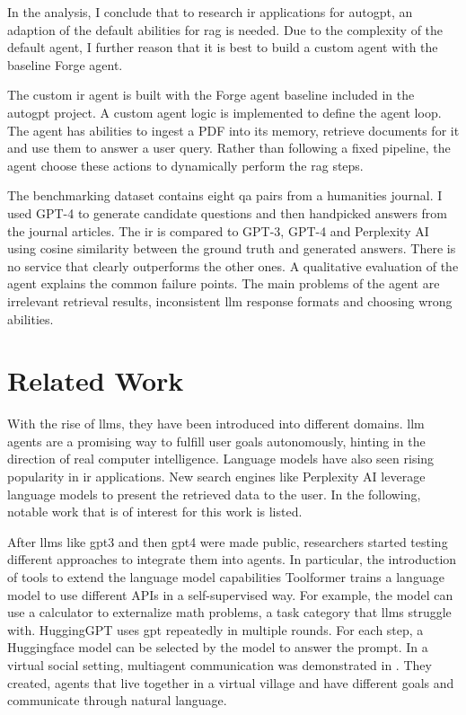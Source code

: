 \documentclass[../main.tex]{subfiles}
\begin{document}
In the analysis, I conclude that to research \gls{ir} applications for \gls{autogpt},
an adaption of the default abilities for \gls{rag} is needed.
Due to the complexity of the default agent,
I further reason that it is best to build a custom agent with the baseline Forge agent.

The custom \gls{ir} agent is built with the Forge agent baseline included in the
\gls{autogpt} project.
A custom agent logic is implemented to define the agent loop.
The agent has abilities to ingest a PDF into its memory, retrieve documents for it
and use them to answer a user query.
Rather than following a fixed pipeline, the agent choose these actions to
dynamically perform the \gls{rag} steps.

The benchmarking dataset contains eight \gls{qa} pairs from a humanities journal.
I used GPT-4 to generate candidate questions and then handpicked answers from
the journal articles.
The \gls{ir} is compared to GPT-3, GPT-4 and Perplexity AI
using cosine similarity between the ground truth and generated answers.
There is no service that clearly outperforms the other ones.
A qualitative evaluation of the agent explains the common failure points.
The main problems of the agent are irrelevant retrieval results,
inconsistent \gls{llm} response formats and choosing wrong abilities.

\section{Related Work}

With the rise of \glspl{llm}, they have been introduced into different domains.
\Gls{llm} agents are a promising way to fulfill user goals autonomously,
hinting in the direction of real computer intelligence.
Language models have also seen rising popularity in \gls{ir} applications.
New search engines like Perplexity AI leverage language models
to present the retrieved data to the user.
In the following,
notable work that is of interest for this work is listed.

After \glspl{llm} like \gls{gpt3} and then \gls{gpt4} were made public,
researchers started testing different approaches to integrate them into agents.
In particular, the introduction of tools to extend the language model capabilities
Toolformer \cite{Schick2023} trains a language model to use different APIs in a self-supervised way.
For example, the model can use a calculator to externalize math problems,
a task category that \glspl{llm} struggle with.
HuggingGPT \cite{Shen2023} uses \gls{gpt} repeatedly in multiple rounds.
For each step, a Huggingface model can be selected by the model to answer the prompt.
In a virtual social setting, multiagent communication was demonstrated in \autocite{Park2023}.
They created, agents that live together in a virtual village
and have different goals and communicate through natural language.
\end{document}
